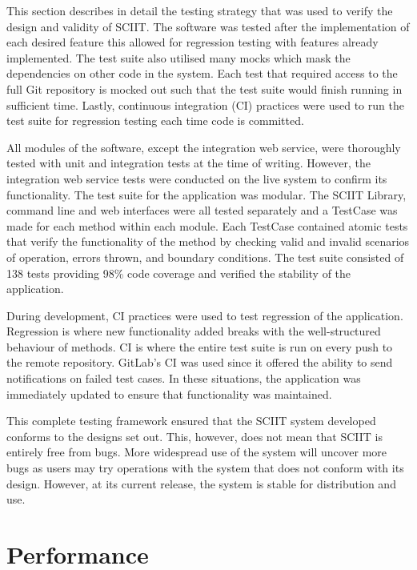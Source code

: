 \documentclass{mproj}
\begin{document}
This section describes in detail the testing strategy that was used to verify the design and validity of SCIIT. The software was tested after the implementation of each desired feature this allowed for regression testing with features already implemented. The test suite also utilised many mocks which mask the dependencies on other code in the system. Each test that required access to the full Git repository is mocked out such that the test suite would finish running in sufficient time. Lastly, continuous integration (CI) practices were used to run the test suite for regression testing each time code is committed.

All modules of the software, except the integration web service, were thoroughly tested with unit and integration tests at the time of writing. However, the integration web service tests were conducted on the live system to confirm its functionality. The test suite for the application was modular. The SCIIT Library, command line and web interfaces were all tested separately and a TestCase was made for each method within each module. Each TestCase contained atomic tests that verify the functionality of the method by checking valid and invalid scenarios of operation, errors thrown, and boundary conditions. The test suite consisted of 138 tests providing 98\% code coverage and verified the stability of the application.

During development, CI practices were used to test regression of the application. Regression is where new functionality added breaks with the well-structured behaviour of methods. CI is where the entire test suite is run on every push to the remote repository. GitLab’s CI was used since it offered the ability to send notifications on failed test cases. In these situations, the application was immediately updated to ensure that functionality was maintained.

This complete testing framework ensured that the SCIIT system developed conforms to the designs set out. This, however, does not mean that SCIIT is entirely free from bugs. More widespread use of the system will uncover more bugs as users may try operations with the system that does not conform with its design. However, at its current release, the system is stable for distribution and use.


\section{Performance}

\end{document}
